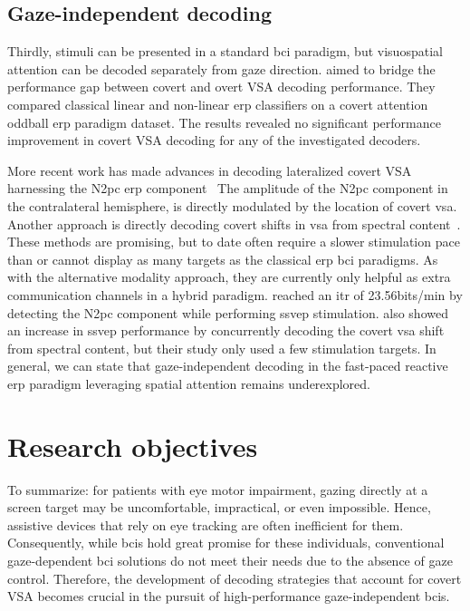\subsection{Gaze-independent decoding}
\label{sec:gaze-independence/sota/decoding}
Thirdly, stimuli can be presented in a standard \ac{bci} paradigm, but visuospatial
attention can be decoded separately from gaze direction.
\textcite{Aloise2012} aimed to bridge the performance gap between covert and
overt VSA decoding performance.
They compared classical linear and non-linear \ac{erp} classifiers on a covert
attention oddball \ac{erp} paradigm dataset.
The results revealed no significant performance improvement in covert VSA
decoding for any of the investigated decoders.

More recent work has made advances in decoding lateralized covert
VSA harnessing the N2pc \ac{erp}
component~\cite{Thiery2016,Reichert2020b,Wang2022}
The amplitude of the N2pc component in the contralateral hemisphere, is directly modulated
by the location of covert \ac{vsa}.
Another approach is directly decoding covert shifts in \ac{vsa} from spectral
content~\cite{Tonin2013}.
These methods are promising, but to date often require a slower stimulation pace than or cannot display as
many targets as the classical \ac{erp} \ac{bci} paradigms.
As with the alternative modality approach, they are currently only helpful as
extra communication channels in a hybrid paradigm.
\textcite{Xu2016} reached an \ac{itr} of 23.56bits/min by detecting the N2pc
component while performing \ac{ssvep} stimulation.
\textcite{Egan2017} also showed an increase in \ac{ssvep} performance by
concurrently decoding the covert \ac{vsa} shift from spectral content, but
their study only used a few stimulation targets.
In general, we can state that gaze-independent decoding in the fast-paced reactive \ac{erp} paradigm
leveraging spatial attention remains underexplored.

\section{Research objectives}

To summarize: for patients with eye motor impairment, gazing directly at a screen target may
be uncomfortable, impractical, or even impossible.
Hence, assistive devices that rely on eye tracking are often inefficient for
them.
Consequently, while \ac{bci}s hold great promise for these individuals, conventional
gaze-dependent \ac{bci} solutions do not meet their needs due to the absence of gaze
control.
Therefore, the development of decoding strategies that account for covert
VSA becomes crucial in the pursuit of high-performance gaze-independent
\ac{bci}s.


